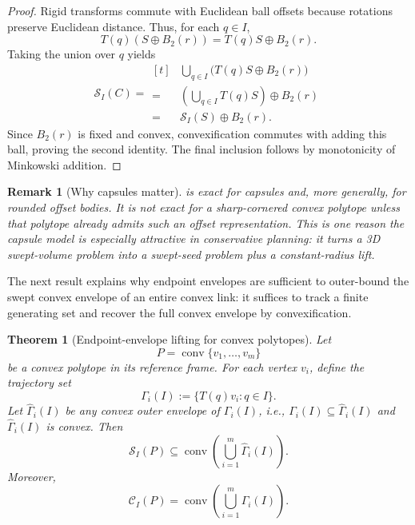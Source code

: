 \documentclass[journal]{IEEEtran}
\newtheorem{theorem}{Theorem}
\newtheorem{remark}{Remark}
\begin{document}
\begin{proof}
Rigid transforms commute with Euclidean ball offsets because rotations preserve
Euclidean distance. Thus, for each $q \in I$,
\[
T(q)(S \oplus B_2(r)) = T(q)S \oplus B_2(r).
\]
Taking the union over $q$ yields
\[
\mathcal{S}_I(C)
= \begin{aligned}[t]
&\bigcup_{q\in I} \bigl(T(q)S \oplus B_2(r)\bigr) \\
=\;&\left(\bigcup_{q\in I} T(q)S\right) \oplus B_2(r) \\
=\;&\mathcal{S}_I(S) \oplus B_2(r).
\end{aligned}
\]
Since $B_2(r)$ is fixed and convex, convexification commutes with adding this
ball, proving the second identity. The final inclusion follows by monotonicity
of Minkowski addition.
\end{proof}

\begin{remark}[Why capsules matter]\label{rem:capsule_exact}
 is exact for capsules and, more generally, for rounded
offset bodies. It is not exact for a sharp-cornered convex polytope unless that
polytope already admits such an offset representation. This is one reason the
capsule model is especially attractive in conservative planning: it turns a 3D
swept-volume problem into a swept-seed problem plus a constant-radius lift.
\end{remark}

The next result explains why endpoint envelopes are sufficient to outer-bound
the swept convex envelope of an entire convex link: it suffices to track a
finite generating set and recover the full convex envelope by convexification.

\begin{theorem}[Endpoint-envelope lifting for convex polytopes]
\label{thm:vertex_lift}
Let
\[
P = \operatorname{conv}\{v_1,\dots,v_m\}
\]
be a convex polytope in its reference frame. For each vertex $v_i$, define the
trajectory set
\[
\Gamma_i(I) := \{T(q)v_i : q\in I\}.
\]
Let $\widehat{\Gamma}_i(I)$ be any convex outer envelope of $\Gamma_i(I)$, i.e.,
$\Gamma_i(I) \subseteq \widehat{\Gamma}_i(I)$ and
$\widehat{\Gamma}_i(I)$ is convex. Then
\[
\mathcal{S}_I(P)
\subseteq
\operatorname{conv}\left(\bigcup_{i=1}^m \widehat{\Gamma}_i(I)\right).
\]
Moreover,
\[
\mathcal{C}_I(P)
= \operatorname{conv}\left(\bigcup_{i=1}^m \Gamma_i(I)\right).
\]
\end{theorem}
\end{document}
